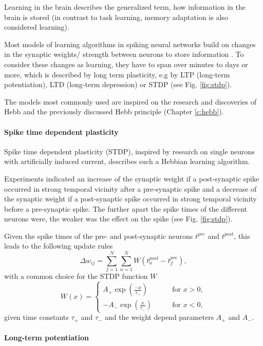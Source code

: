 Learning in the brain describes the generalized term, how information in the brain is stored (in contrast to task learning, memory adaptation is also considered learning).

Most models of learning algorithms in spiking neural networks build on changes in the synaptic weights/ strength between neurons to store information \cite{gerstner2014neuronal}.
To consider these changes as learning, they have to span over minutes to days or more, which is described by long term plasticity, e.g by LTP (long-term potentiation), LTD (long-term depression) or STDP (see Fig. \ref{fig:stdp}).
 
The models most commonly used are inspired on the research and discoveries of Hebb and the previously discussed Hebb principle (Chapter \ref{c:hebb}).

\paragraph{Spike time dependent plasticity} \label{c:stdp}

Spike time dependent plasticity (STDP), inspired by research on single neurons with artificially induced current, describes such a Hebbian learning algorithm.

Experiments indicated an increase of the synaptic weight if a post-synaptic spike occurred in strong temporal vicinity after a pre-synaptic spike and a decrease of the synaptic weight if a post-synaptic spike occurred in strong temporal vicinity before a pre-synaptic spike.
The further apart the spike times of the different neurons were, the weaker was the effect on the spike (see Fig. \ref{fig:stdp}).

Given the spike times of the pre- and post-synaptic neurons $t^{pre}$ and $t^{post}$, this leads to the following update rules \cite{gerstner2014neuronal}\cite{Sjostrom2010}
\[
\Delta w_{ij} = \sum_{f=1}^N \sum_{n=1}^N W(t^{post}_n - t^{pre}_f),
\]
with a common choice for the STDP function $W$
\[
W(x) =
\begin{cases}
A_+ \exp(\frac{-x}{\tau_+}) \quad \quad &\text{for  } x > 0,  \\
-A_- \exp(\frac{x}{\tau_-}) \quad \quad &\text{for  } x < 0,
\end{cases}
\]
given time constants $\tau_+$ and $\tau_-$ and the weight depend parameters $A_+$ and $A_-$.
     

\paragraph{Long-term potentiation} \label{c:ltp}
 
